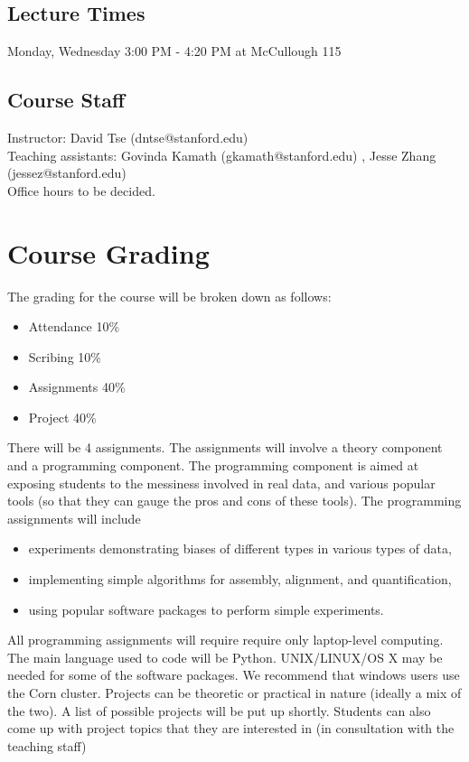 \documentclass[11pt,onecolumn]{article}
\begin{document}
\subsection*{Lecture Times}
Monday, Wednesday 3:00 PM - 4:20 PM at McCullough 115

\subsection*{Course Staff}
Instructor: David Tse (dntse@stanford.edu) \\
Teaching assistants: Govinda Kamath (gkamath@stanford.edu) , Jesse Zhang (jessez@stanford.edu) \\
Office hours to be decided.
\pagebreak

\section*{Course Grading}
The grading for the course will be broken down as follows:
\begin{itemize}
	\itemsep0em 
	\item Attendance 10\%
	\item Scribing 10\%
	\item Assignments 40\%
	\item Project 40\%
\end{itemize}
There will be 4 assignments. The assignments will involve a theory component and a programming component. The programming component is aimed at exposing students to the messiness involved in real data, and various popular tools (so that they can gauge the pros and cons of these tools). The programming assignments will include
\begin{itemize}
	\itemsep0em
	\item experiments demonstrating biases of different types in various types of data,
	\item implementing simple algorithms for assembly, alignment, and quantification,
	\item using popular software packages to perform simple experiments. 
\end{itemize}
All programming assignments will require require only laptop-level computing. The main language used to code will be Python. UNIX/LINUX/OS X may be needed for some of the software packages. We recommend that windows users use the Corn cluster. Projects can be theoretic or practical in nature (ideally a mix of the two). A list of possible projects will be put up shortly. Students can also come up with project topics that they are interested in (in consultation with the teaching staff) \\
\end{document}
